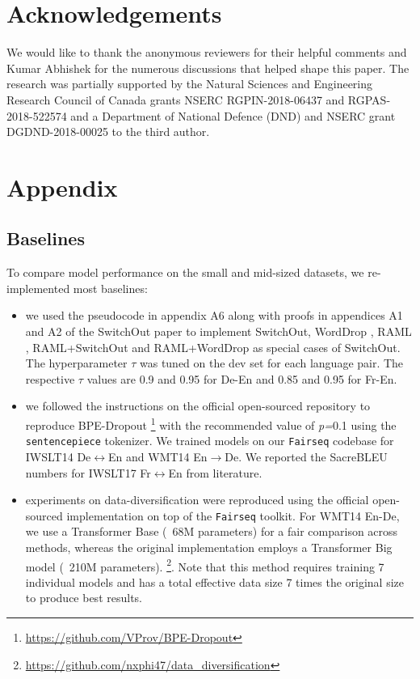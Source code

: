 \documentclass[11pt]{article}
\begin{document}
\section*{Acknowledgements}
We would like to thank the anonymous reviewers for their helpful comments
and Kumar Abhishek for the numerous discussions that helped shape this paper. The research was partially supported by the Natural Sciences and Engineering Research Council of Canada grants NSERC RGPIN-2018-06437 and RGPAS-2018-522574 and a Department of National Defence (DND) and NSERC grant DGDND-2018-00025 to the third author.




\clearpage
\appendix

\section{Appendix}
\label{sec:appendix}

\subsection{Baselines}\label{sec:baselines}

To compare model performance on the small and mid-sized datasets, we re-implemented most baselines:
\begin{itemize}
    \item we used the pseudocode in appendix A6 along with proofs in appendices A1 and A2 of the SwitchOut paper \cite{wang-etal-2018-switchout} to implement SwitchOut, WordDrop \cite{sennrich-etal-2016-edinburgh}, RAML \cite{Norouzi2016RewardAM}, RAML+SwitchOut and RAML+WordDrop as special cases of SwitchOut. The hyperparameter $\tau$ was tuned on the dev set for each language pair. The respective $\tau$ values are 0.9 and 0.95 for De-En and 0.85 and 0.95 for Fr-En.
    
    \item we followed the instructions on the official open-sourced repository to reproduce BPE-Dropout \cite{provilkov2020bpe} \footnote{\url{https://github.com/VProv/BPE-Dropout}} with the recommended value of \emph{p=}0.1 using the \texttt{sentencepiece} tokenizer. We trained models on our \texttt{Fairseq} codebase for IWSLT14 De$\leftrightarrow$En and WMT14 En$\rightarrow$De. We reported the SacreBLEU numbers for IWSLT17 Fr$\leftrightarrow$En from literature.
    
    \item experiments on data-diversification \cite{nguyen19datadiverse} were reproduced using the official open-sourced implementation on top of the \texttt{Fairseq} toolkit. For WMT14 En-De, we use a Transformer Base (~68M parameters) for a fair comparison across methods, whereas the original implementation employs a Transformer Big model (~210M parameters). \footnote{\url{https://github.com/nxphi47/data\_diversification}}. Note that this method requires training 7 individual models and has a total effective data size 7 times the original size to produce best results. 
\end{itemize}
\end{document}

